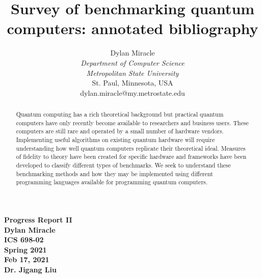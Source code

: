 \documentclass{article}
\begin{document}
\begin{titlepage}
    \begin{center}
        \vspace{4cm}
        \Huge
        \textbf{
            Progress Report II \\
            Dylan Miracle \\
            ICS 698-02 \\
            Spring 2021 \\
            Feb 17, 2021 \\
            Dr. Jigang Liu
        }
    \end{center}
\end{titlepage}
\title{Survey of benchmarking quantum computers: annotated bibliography}

\author{Dylan Miracle\\
\textit{Department of Computer Science} \\
\textit{Metropolitan State University}\\
St. Paul, Minnesota, USA \\
dylan.miracle@my.metrostate.edu
}

\maketitle

\tableofcontents
\begin{abstract}
Quantum computing has a rich theoretical background but practical quantum computers have only recently become available to researchers and business users. These computers are still rare and operated by a small number of hardware vendors. Implementing useful algorithms on existing quantum hardware will require understanding how well quantum computers replicate their theoretical ideal. Measures of fidelity to theory have been created for specific hardware and frameworks have been developed to classify  different types of benchmarks. We seek to understand these benchmarking methods and how they may be implemented using different programming languages available for programming quantum computers.
\end{abstract}
\end{document}
